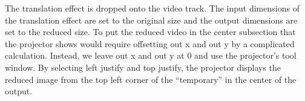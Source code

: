 The translation effect is dropped onto the video track. The input dimensions of the translation effect are set to the original size and the output dimensions are set to the reduced size. 
To put the reduced video in the center subsection that the projector shows would require offsetting out x and out y by a complicated calculation. 
Instead, we leave out x and out y at 0 and use the projector's tool window. 
By selecting left justify and top justify, the projector displays the reduced image from the top left corner of the “temporary” in the center of the output.

 


